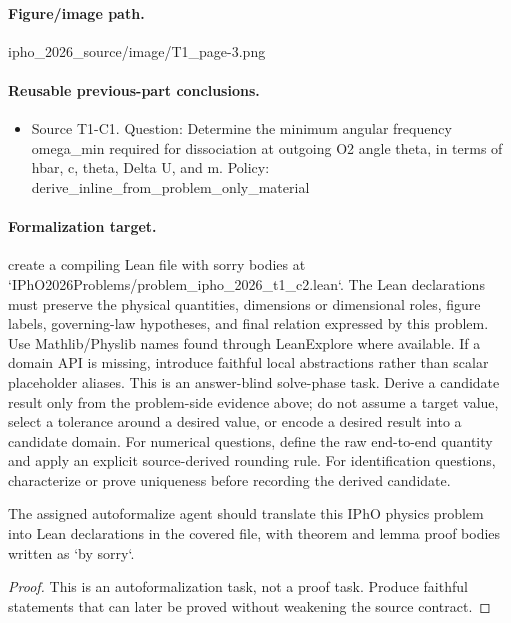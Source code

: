 \paragraph{Figure/image path.}
ipho\_2026\_source/image/T1\_page-3.png

\paragraph{Reusable previous-part conclusions.}
\begin{itemize}
\item Source T1-C1. Question: Determine the minimum angular frequency omega\_min required for dissociation at outgoing O2 angle theta, in terms of hbar, c, theta, Delta U, and m. Policy: derive\_inline\_from\_problem\_only\_material
\end{itemize}

\paragraph{Formalization target.}
create a compiling Lean file with sorry bodies at `IPhO2026Problems/problem\_ipho\_2026\_t1\_c2.lean`.
The Lean declarations must preserve the physical quantities, dimensions or dimensional roles, figure labels, governing-law hypotheses, and final relation expressed by this problem.
Use Mathlib/Physlib names found through LeanExplore where available. If a domain API is missing, introduce faithful local abstractions rather than scalar placeholder aliases.
This is an answer-blind solve-phase task. Derive a candidate result only from the problem-side evidence above; do not assume a target value, select a tolerance around a desired value, or encode a desired result into a candidate domain.
For numerical questions, define the raw end-to-end quantity and apply an explicit source-derived rounding rule. For identification questions, characterize or prove uniqueness before recording the derived candidate.

\begin{theorem}
\label{thm:physics:ipho_2026_t1_c2:target}
The assigned autoformalize agent should translate this IPhO physics problem into Lean declarations in the covered file, with theorem and lemma proof bodies written as `by sorry`.
\end{theorem}
\begin{proof}
This is an autoformalization task, not a proof task. Produce faithful statements that can later be proved without weakening the source contract.
\end{proof}

